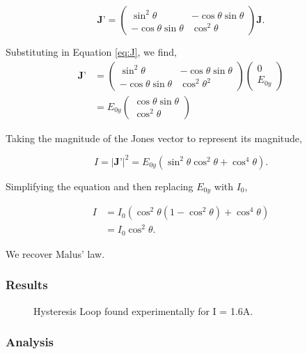 \documentclass{article}
\begin{document}
\begin{equation}
    \textbf{J'} = \begin{pmatrix}
        \sin^2{\theta} & -\cos{\theta}\sin{\theta} \\
        -\cos{\theta}\sin{\theta} & \cos^2{\theta}
    \end{pmatrix} \textbf{J}.
\end{equation}

Substituting in Equation \ref{eq:J}, we find,
\begin{align}
    \textbf{J'} &= \begin{pmatrix}
        \sin^2{\theta} & -\cos{\theta}\sin{\theta} \\
        -\cos{\theta}\sin{\theta} & \cos^2{\theta}^2
    \end{pmatrix} 
    \begin{pmatrix}
        0 \\
        E_{0y}
    \end{pmatrix} \\
    &= E_{0y}\begin{pmatrix}
        \cos{\theta}\sin{\theta} \\
        \cos^2{\theta}
    \end{pmatrix}
\end{align}

Taking the magnitude of the Jones vector to represent its magnitude,

\begin{equation}
    I = |\textbf{J'}|^2 = E_{0y}(\sin^2{\theta}\cos^2{\theta}+\cos^4{\theta}).
\end{equation}

Simplifying the equation and then replacing $E_{0y}$ with $I_0$,

\begin{align}
    I &= I_0(\cos^2{\theta}(1-\cos^2{\theta})+\cos^4{\theta}) \\
    &= I_0\cos^2{\theta}.
\end{align}

We recover Malus' law.

\subsubsection{Results}
\begin{figure} [H]
    \centering
    \scalebox{0.75}{}
    \label{fig:ml}
    \caption{Hysteresis Loop found experimentally for I = 1.6A.}
\end{figure}
\subsubsection{Analysis}
\end{document}
